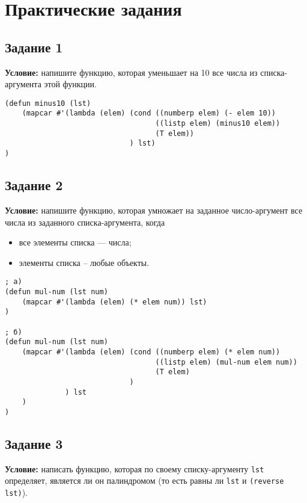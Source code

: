 \chapter{Практические задания}

\section{Задание 1}

\textbf{Условие:} напишите функцию, которая уменьшает на 10 все числа из списка-аргумента этой функции.

\begin{lstlisting}
(defun minus10 (lst)
    (mapcar #'(lambda (elem) (cond ((numberp elem) (- elem 10))
                                   ((listp elem) (minus10 elem)) 
                                   (T elem))
                             ) lst)
)
\end{lstlisting}


\section{Задание 2}

\textbf{Условие:} напишите функцию, которая умножает на заданное число-аргумент все числа из заданного списка-аргумента, когда
\begin{itemize}
    \item все элементы списка --- числа;
    \item элементы списка -- любые объекты.
\end{itemize}


\begin{lstlisting}
; а)
(defun mul-num (lst num)
    (mapcar #'(lambda (elem) (* elem num)) lst)
)

; б)
(defun mul-num (lst num)
    (mapcar #'(lambda (elem) (cond ((numberp elem) (* elem num))
                                   ((listp elem) (mul-num elem num))
                                   (T elem)
                             )
              ) lst
    )
)
\end{lstlisting}


\section{Задание 3}

\textbf{Условие:} написать функцию, которая по своему списку-аргументу \texttt{lst} определяет, является ли он палиндромом (то есть равны ли \texttt{lst} и \texttt{(reverse lst)}).



